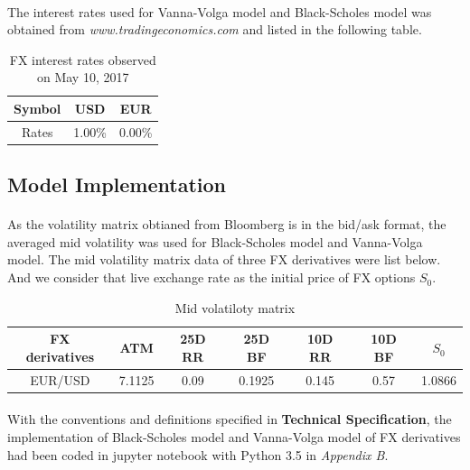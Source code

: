 \paragraph{}
The interest rates used for Vanna-Volga model and Black-Scholes model was obtained from \textit{www.tradingeconomics.com} and listed in the following table.

\begin{table}[htb]
\centering
\caption{{FX interest rates observed on May 10, 2017}}
\begin{tabular}{ccc}
\hline	\hline %
Symbol & USD & EUR   \\ [1ex]%
\hline
Rates & 1.00\% & 0.00\%    \\ [1ex]
\hline
\end{tabular}
\label{table:FX_rates}
\end{table}

\subsection{Model Implementation}
\paragraph{}
As the volatility matrix obtianed from Bloomberg is in the bid/ask format, the averaged mid volatility was used for Black-Scholes model and Vanna-Volga model. The mid volatility matrix data of three FX derivatives were list below. And we consider that live exchange rate as the initial price of FX options $S_0$.

\begin{table}[htb]
\centering
\caption{Mid volatiloty matrix}
\begin{tabular}{ccccccc}
\hline \hline
FX derivatives & ATM  & 25D RR  & 25D BF  & 10D RR  & 10D BF & $S_0$\\ [0.5ex]
\hline 
EUR/USD  & 7.1125 &0.09& 0.1925 &0.145 &0.57&1.0866 \\[0.5ex]
\hline
\end{tabular}
\end{table}

\paragraph{}
With the conventions and definitions specified in \textbf{Technical Specification}, the implementation of Black-Scholes model and Vanna-Volga model of FX derivatives had been coded in jupyter notebook with Python 3.5 in \textit{Appendix B}.


